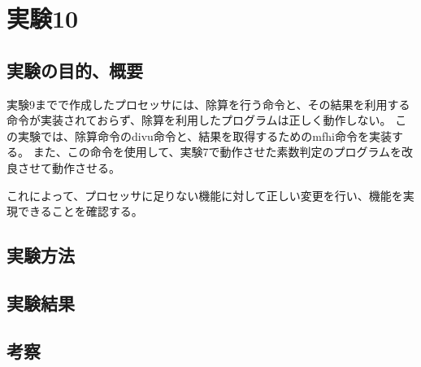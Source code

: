 \section{実験10}
\subsection{実験の目的、概要}
実験9までで作成したプロセッサには、除算を行う命令と、その結果を利用する命令が実装されておらず、除算を利用したプログラムは正しく動作しない。
この実験では、除算命令のdivu命令と、結果を取得するためのmfhi命令を実装する。
また、この命令を使用して、実験7で動作させた素数判定のプログラムを改良させて動作させる。

これによって、プロセッサに足りない機能に対して正しい変更を行い、機能を実現できることを確認する。

\subsection{実験方法}

\subsection{実験結果}

\subsection{考察}
